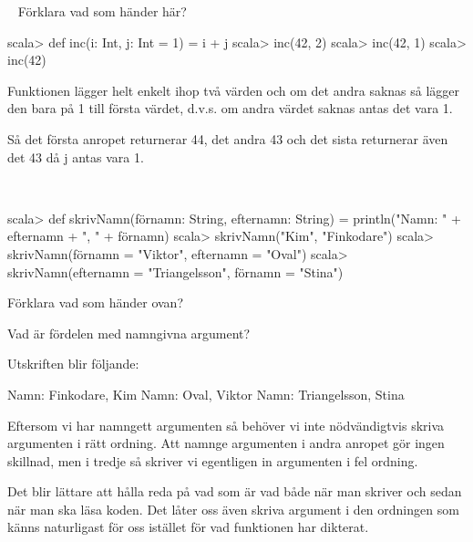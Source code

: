 
\QUESTBEGIN

\Task  \what~  Förklara vad som händer här?

\begin{REPL}
scala> def inc(i: Int, j: Int = 1) = i + j
scala> inc(42, 2)
scala> inc(42, 1)
scala> inc(42)
\end{REPL}

\SOLUTION

\TaskSolved \what

Funktionen lägger helt enkelt ihop två värden och om det andra saknas så lägger den bara på 1 till första värdet, d.v.s. om andra värdet saknas antas det vara 1.

Så det första anropet returnerar 44, det andra 43 och det sista returnerar även det 43 då j antas vara 1.

\QUESTEND









\QUESTBEGIN

\Task  \what~
\begin{REPL}
scala> def skrivNamn(förnamn: String, efternamn: String) =
         println("Namn: " + efternamn + ", " + förnamn)
scala> skrivNamn("Kim", "Finkodare")
scala> skrivNamn(förnamn = "Viktor", efternamn = "Oval")
scala> skrivNamn(efternamn = "Triangelsson", förnamn = "Stina")
\end{REPL}

\Subtask Förklara vad som händer ovan?

\Subtask Vad är fördelen med namngivna argument?



\SOLUTION


\TaskSolved \what


\SubtaskSolved
Utskriften blir följande:
\begin{REPLnonum}
Namn: Finkodare, Kim
Namn: Oval, Viktor
Namn: Triangelsson, Stina
\end{REPLnonum}
Eftersom vi har namngett argumenten så behöver vi inte nödvändigtvis skriva argumenten i rätt ordning. Att namnge argumenten i andra anropet gör ingen skillnad, men i tredje så skriver vi egentligen in argumenten i fel ordning.

\SubtaskSolved
Det blir lättare att hålla reda på vad som är vad både när man skriver och sedan när man ska läsa koden. Det låter oss även skriva argument i den ordningen som känns naturligast för oss istället för vad funktionen har dikterat.



